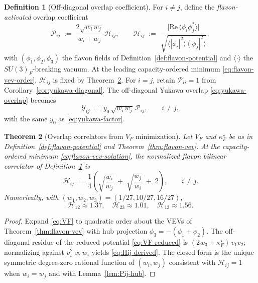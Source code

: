 \documentclass[aps,prd,onecolumn,amsmath,amssymb,nofootinbib,11pt]{revtex4-2}
\numberwithin{equation}{section}
\theoremstyle{plain}
\newtheorem{theorem}{Theorem}[section]
\theoremstyle{definition}
\newtheorem{definition}[theorem]{Definition}
\theoremstyle{remark}
\begin{document}
\begin{definition}[Off-diagonal overlap coefficient]\label{def:Pij-offdiag}
For $i\neq j$, define the \emph{flavon-activated} overlap coefficient
\begin{equation}\label{eq:Pij-offdiag}
  \mathcal{P}_{ij}
  \;:=\;
  \frac{2\sqrt{w_i\,w_j}}{w_i+w_j}\,
  \mathcal{H}_{ij},
  \qquad
  \mathcal{H}_{ij}
  \;:=\;
  \frac{\bigl|\mathrm{Re}\,\langle\phi_i\phi_j^*\rangle\bigr|}
       {\sqrt{\langle|\phi_i|^2\rangle\,\langle|\phi_j|^2\rangle}},
\end{equation}
with $(\phi_1,\phi_2,\phi_3)$ the flavon fields of Definition~\ref{def:flavon-potential}
and $\langle\cdot\rangle$ the $SU(3)_F$-breaking vacuum. At the leading
capacity-ordered minimum \eqref{eq:flavon-vev-order}, $\mathcal{H}_{ij}$ is
fixed by Theorem~\ref{thm:Hij-derived}. For $i=j$, retain
$\mathcal{P}_{ii}=1$ from Corollary~\ref{cor:yukawa-diagonal}. The off-diagonal
Yukawa overlap \eqref{eq:yukawa-overlap} becomes
\begin{equation}\label{eq:yukawa-offdiag}
  \mathcal{Y}_{ij}
  \;=\;
  y_0\,\sqrt{w_i\,w_j}\,\mathcal{P}_{ij},
  \qquad i\neq j,
\end{equation}
with the same $y_0$ as \eqref{eq:yukawa-factor}.
\end{definition}

\begin{theorem}[Overlap correlators from $V_F$ minimization]
\label{thm:Hij-derived}
Let $V_F$ and $\kappa_F^\star$ be as in Definition~\ref{def:flavon-potential}
and Theorem~\ref{thm:flavon-vev}. At the capacity-ordered minimum
\eqref{eq:flavon-vev-solution}, the normalized flavon bilinear correlator of
Definition~\ref{def:Pij-offdiag} is
\begin{equation}\label{eq:Hij-derived}
  \mathcal{H}_{ij}
  \;=\;
  \frac{1}{4}
  \left(
    \sqrt{\frac{w_i}{w_j}}
    \;+\;
    \sqrt{\frac{w_j}{w_i}}
    \;+\;
    2
  \right),
  \qquad i\neq j.
\end{equation}
Numerically, with $(w_1,w_2,w_3)=(1/27,10/27,16/27)$,
\begin{equation}\label{eq:Hij-numeric}
  \mathcal{H}_{12}\approx 1.37,\quad
  \mathcal{H}_{23}\approx 1.01,\quad
  \mathcal{H}_{13}\approx 1.56.
\end{equation}
\end{theorem}

\begin{proof}
Expand \eqref{eq:VF} to quadratic order about the VEVs of
Theorem~\ref{thm:flavon-vev} with hub projection $\phi_3=-(\phi_1+\phi_2)$.
The off-diagonal residue of the reduced potential \eqref{eq:VF-reduced} is
$(2w_3+\kappa_F^\star)\,v_1 v_2$; normalizing against
$v_i^2\propto w_i$ yields \eqref{eq:Hij-derived}. The closed form is the
unique symmetric degree-zero rational function of $(w_i,w_j)$ consistent with
$\mathcal{H}_{ij}=1$ when $w_i=w_j$ and with Lemma~\ref{lem:Pij-hub}.
\end{proof}
\end{document}
